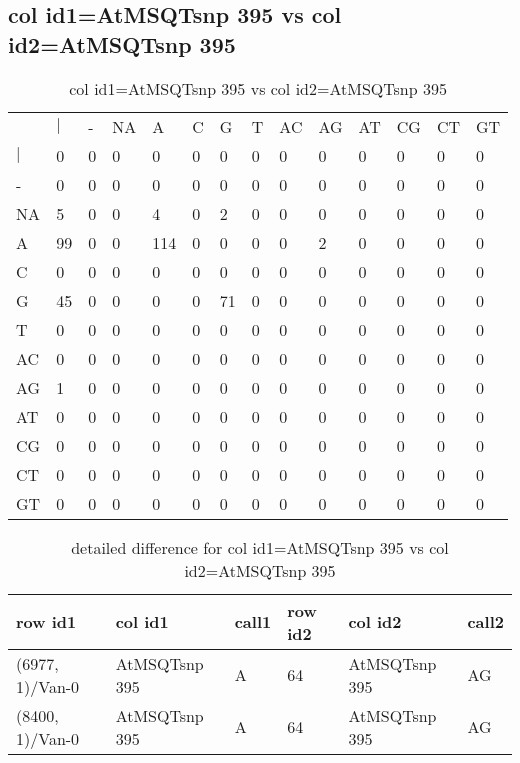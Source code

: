 \subsection{col id1=AtMSQTsnp 395 vs col id2=AtMSQTsnp 395}
\begin{center}
\begin{longtable}{|l|l|l|l|l|l|l|l|l|l|l|l|l|l|}
\caption{col id1=AtMSQTsnp 395 vs col id2=AtMSQTsnp 395} \label{table_dm908}\\
\hline
\\
\hline
&$|$&-&NA&A&C&G&T&AC&AG&AT&CG&CT&GT\\
$|$&0&0&0&0&0&0&0&0&0&0&0&0&0\\
-&0&0&0&0&0&0&0&0&0&0&0&0&0\\
NA&5&0&0&4&0&2&0&0&0&0&0&0&0\\
A&99&0&0&114&0&0&0&0&2&0&0&0&0\\
C&0&0&0&0&0&0&0&0&0&0&0&0&0\\
G&45&0&0&0&0&71&0&0&0&0&0&0&0\\
T&0&0&0&0&0&0&0&0&0&0&0&0&0\\
AC&0&0&0&0&0&0&0&0&0&0&0&0&0\\
AG&1&0&0&0&0&0&0&0&0&0&0&0&0\\
AT&0&0&0&0&0&0&0&0&0&0&0&0&0\\
CG&0&0&0&0&0&0&0&0&0&0&0&0&0\\
CT&0&0&0&0&0&0&0&0&0&0&0&0&0\\
GT&0&0&0&0&0&0&0&0&0&0&0&0&0\\
\hline
\end{longtable}
\end{center}

\begin{center}
\begin{longtable}{|l|l|l|l|l|l|}
\caption{detailed difference for col id1=AtMSQTsnp 395 vs col id2=AtMSQTsnp 395} \label{table_dm909}\\
\hline
row id1&col id1&call1&row id2&col id2&call2\\
\hline
(6977, 1)/Van-0&AtMSQTsnp 395&A&64&AtMSQTsnp 395&AG\\
(8400, 1)/Van-0&AtMSQTsnp 395&A&64&AtMSQTsnp 395&AG\\
\hline
\end{longtable}
\end{center}

